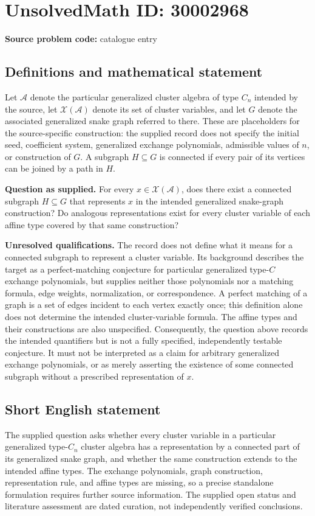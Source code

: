 \documentclass[11pt]{article}
\begin{document}
\section*{UnsolvedMath ID: 30002968}
\textbf{Source problem code:} catalogue entry
\subsection{Definitions and mathematical statement}
Let \(\mathcal A\) denote the particular generalized cluster algebra of type \(C_n\) intended by the source, let \(\mathcal X(\mathcal A)\) denote its set of cluster variables, and let \(G\) denote the associated generalized snake graph referred to there. These are placeholders for the source-specific construction: the supplied record does not specify the initial seed, coefficient system, generalized exchange polynomials, admissible values of \(n\), or construction of \(G\). A subgraph \(H\subseteq G\) is connected if every pair of its vertices can be joined by a path in \(H\).

\textbf{Question as supplied.} For every \(x\in\mathcal X(\mathcal A)\), does there exist a connected subgraph \(H\subseteq G\) that represents \(x\) in the intended generalized snake-graph construction? Do analogous representations exist for every cluster variable of each affine type covered by that same construction?

\textbf{Unresolved qualifications.} The record does not define what it means for a connected subgraph to represent a cluster variable. Its background describes the target as a perfect-matching conjecture for particular generalized type-\(C\) exchange polynomials, but supplies neither those polynomials nor a matching formula, edge weights, normalization, or correspondence. A perfect matching of a graph is a set of edges incident to each vertex exactly once; this definition alone does not determine the intended cluster-variable formula. The affine types and their constructions are also unspecified. Consequently, the question above records the intended quantifiers but is not a fully specified, independently testable conjecture. It must not be interpreted as a claim for arbitrary generalized exchange polynomials, or as merely asserting the existence of some connected subgraph without a prescribed representation of \(x\).
\subsection{Short English statement}
The supplied question asks whether every cluster variable in a particular generalized type-\(C_n\) cluster algebra has a representation by a connected part of its generalized snake graph, and whether the same construction extends to the intended affine types. The exchange polynomials, graph construction, representation rule, and affine types are missing, so a precise standalone formulation requires further source information. The supplied open status and literature assessment are dated curation, not independently verified conclusions.
\end{document}

